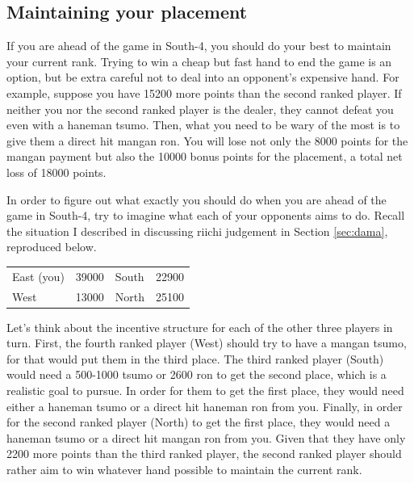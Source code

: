 \subsection*{Maintaining your placement}
If you are ahead of the game in South-4, you should do your best to maintain your current rank. Trying to win a cheap but fast hand to end the game is an option, but be extra careful not to deal into an opponent's expensive hand. For example, suppose you have 15200 more points than the second ranked player. If neither you nor the second ranked player is the dealer, they cannot defeat you even with a {\jap haneman tsumo}. Then, what you need to be wary of the most is to give them a direct hit {\jap mangan ron}. You will lose not only the 8000 points for the {\jap mangan} payment but also the 10000 bonus points for the placement, a total net loss of 18000 points.

\bigskip
In order to figure out what exactly you should do when you are ahead of the game in South-4, try to imagine what each of your opponents aims to do. Recall the situation I described in discussing riichi judgement in Section \ref{sec:dama}, reproduced below.

\begin{table}[h]
\begin{center}
\begin{tabular}{l r l r}
East (you) & 39000 & South & 22900\\
West & 13000 & North & 25100\\
\end{tabular}
\end{center}
\vspace{-10pt}
\end{table}

\bigskip
Let's think about the incentive structure for each of the other three players in turn. First, the fourth ranked player (West) should try to have a {\jap mangan tsumo}, for that would put them in the third place. The third ranked player (South) would need a 500-1000 {\jap tsumo} or 2600 {\jap ron} to get the second place, which is a realistic goal to pursue. In order for them to get the first place, they would need either a {\jap haneman tsumo} or a direct hit {\jap haneman ron} from you. Finally, in order for the second ranked player (North) to get the first place, they would need a {\jap haneman tsumo} or a direct hit {\jap mangan ron} from you. Given that they have only 2200 more points than the third ranked player, the second ranked player should rather aim to win whatever hand possible to maintain the current rank. 

